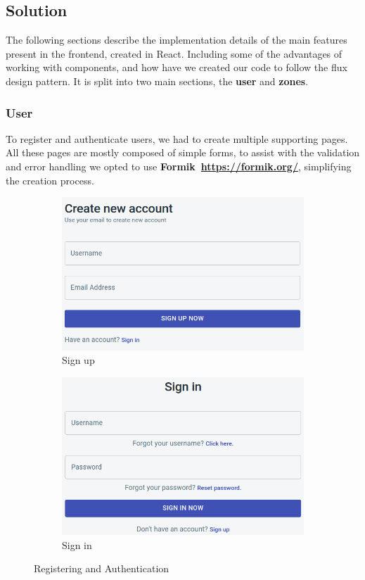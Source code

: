 \subsection{Solution}
\label{ss:ui-solution}

The following sections describe the implementation details of the main features present in the frontend, created in React. Including some of the advantages of working with components, and how have we created our code to follow the flux design pattern. It is split into two main sections, the \textbf{user} and \textbf{zones}.

\subsubsection{User}
\label{s:user}

To register and authenticate users, we had to create multiple supporting pages. All these pages are mostly composed of simple forms, to assist with the validation and error handling we opted to use \textbf{Formik~\url{https://formik.org/}}, simplifying the creation process. 

\begin{figure}[H]
     \centering
     \begin{subfigure}[b]{0.49\textwidth}
         \centering
         \includegraphics[width=0.8\linewidth]{Chapters/img/frontend/signUp.png}
    	\caption{Sign up}
    	\label{fig:signup}
     \end{subfigure}
     \hfill
     \begin{subfigure}[b]{0.49\textwidth}
         \centering
         \includegraphics[width=0.8\linewidth]{Chapters/img/frontend/login.png}
	\caption{Sign in}
	\label{fig:signin}
     \end{subfigure}
     \caption{Registering and Authentication}
\end{figure}

